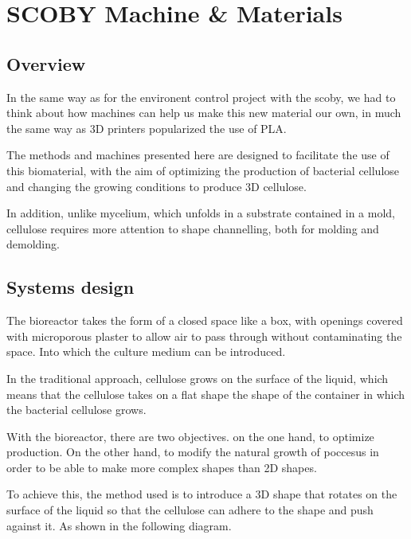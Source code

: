\chapter{SCOBY Machine \& Materials}


\section{Overview}

In the same way as for the environent control project with the scoby, we had to think about how machines can help us make this new material our own, in much the same way as 3D printers popularized the use of PLA. 

The methods and machines presented here are designed to facilitate the use of this biomaterial, with the aim of optimizing the production of bacterial cellulose and changing the growing conditions to produce 3D cellulose. 

In addition, unlike mycelium, which unfolds in a substrate contained in a mold, cellulose requires more attention to shape channelling, both for molding and demolding. 


\section{Systems design}

The bioreactor takes the form of a closed space like a box, with openings covered with microporous plaster to allow air to pass through without contaminating the space. Into which the culture medium can be introduced.

In the traditional approach, cellulose grows on the surface of the liquid, which means that the cellulose takes on a flat shape \- the shape of the container in which the bacterial cellulose grows. 

With the bioreactor, there are two objectives. on the one hand, to optimize production. On the other hand, to modify the natural growth of poccesus in order to be able to make more complex shapes than 2D shapes. 

To achieve this, the method used is to introduce a 3D shape that rotates on the surface of the liquid so that the cellulose can adhere to the shape and push against it. As shown in the following diagram. 

